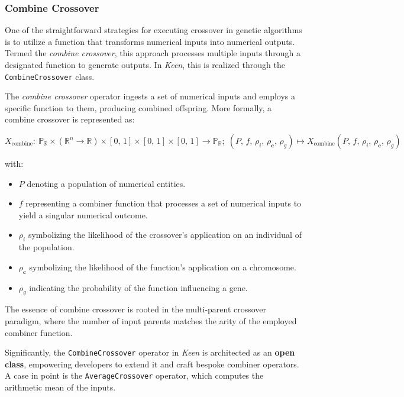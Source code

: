 \subsubsection{Combine Crossover}
\label{sec:keen:op:cx:combine}

  One of the straightforward strategies for executing crossover in genetic 
  algorithms is to utilize a function that transforms numerical inputs into numerical outputs. Termed the \textit{combine crossover}, this approach 
  processes multiple inputs through a designated function to generate outputs. 
  In \textit{Keen}, this is realized through the \texttt{CombineCrossover} 
  class.

  \begin{definition}
    The \textit{combine crossover} operator ingests a set of numerical inputs 
    and employs a specific function to them, producing combined offspring. More 
    formally, a combine crossover is represented as:

    \begin{equation}
      X_\mathrm{combine} :\: 
        \mathbb{P}_\mathbb{R} \times (\mathbb{R}^n \rightarrow \mathbb{R})
          \times [0,\, 1] \times [0,\, 1] \times [0,\, 1] 
            \rightarrow \mathbb{P}_\mathbb{R};\;
        (P,\, f,\, \rho_i,\, \rho_\mathbf{c},\, \rho_g)
          \mapsto X_\mathrm{combine}(P,\, f,\, \rho_i,\, \rho_\mathbf{c},\, 
            \rho_g)
    \end{equation}

    with:

    \begin{itemize}
      \item \(P\) denoting a population of numerical entities.
      \item \(f\) representing a combiner function that processes a set of 
        numerical inputs to yield a singular numerical outcome.
      \item \(\rho_i\) symbolizing the likelihood of the crossover's application
        on an individual of the population.
      \item \(\rho_\mathbf{c}\) symbolizing the likelihood of the function's 
        application on a chromosome.
      \item \(\rho_g\) indicating the probability of the function influencing a 
        gene.
    \end{itemize}
  \end{definition}

  \begin{remark}
    The essence of combine crossover is rooted in the multi-parent crossover 
    paradigm, where the number of input parents matches the arity of the 
    employed combiner function.
  \end{remark}

  Significantly, the \texttt{CombineCrossover} operator in \textit{Keen} is 
  architected as an \textbf{open class}, empowering developers to extend it and 
  craft bespoke combiner operators. A case in point is the 
  \texttt{AverageCrossover} operator, which computes the arithmetic mean of the 
  inputs.
